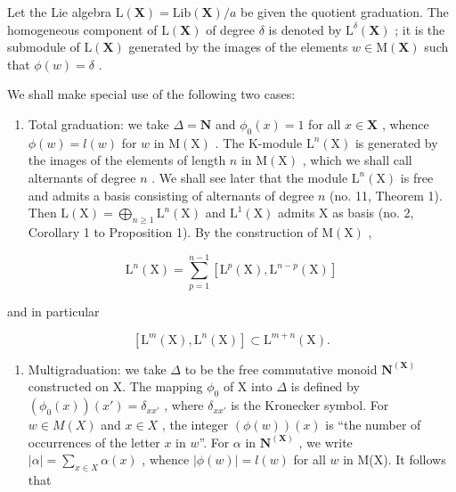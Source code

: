 Let the Lie algebra \(\mathrm{L}(\mathbf{X}) = \mathrm{Lib}(\mathbf{X}) / a\) be given the quotient graduation. The homogeneous component of \(\mathrm{L}(\mathbf{X})\) of degree \(\delta\) is denoted by \(\mathrm{L}^{\delta}(\mathbf{X})\) ; it is the submodule of \(\mathrm{L}(\mathbf{X})\) generated by the images of the elements \(w \in \mathrm{M}(\mathbf{X})\) such that \(\phi(w) = \delta\) .

We shall make special use of the following two cases:

\begin{enumerate}
\def\labelenumi{(\alph{enumi})}
\tightlist
\item
  Total graduation: we take \(\Delta = \mathbf{N}\) and \(\phi_0(x) = 1\) for all \(x\in \mathbf{X}\) , whence \(\phi (w) = l(w)\) for \(w\) in \(\mathrm{M}(\mathrm{X})\) . The K-module \(\mathrm{L}^n (\mathrm{X})\) is generated by the images of the elements of length \(n\) in \(\mathrm{M}(\mathrm{X})\) , which we shall call alternants of degree \(n\) . We shall see later that the module \(\mathrm{L}^n (\mathrm{X})\) is free and admits a basis consisting of alternants of degree \(n\) (no. 11, Theorem 1). Then \(\mathrm{L}(\mathrm{X}) = \bigoplus_{n\geq 1}\mathrm{L}^n (\mathrm{X})\) and \(\mathrm{L}^1 (\mathrm{X})\) admits X as basis (no. 2, Corollary 1 to Proposition 1). By the construction of \(\mathrm{M}(\mathrm{X})\) ,
\end{enumerate}

\[
\mathrm{L} ^ {n} (\mathrm{X}) = \sum_ {p = 1} ^ {n - 1} [ \mathrm{L} ^ {p} (\mathrm{X}), \mathrm{L} ^ {n - p} (\mathrm{X}) ]\tag{12}
\]

and in particular

\[
[ \mathrm{L} ^ {m} (\mathrm{X}), \mathrm{L} ^ {n} (\mathrm{X}) ] \subset \mathrm{L} ^ {m + n} (\mathrm{X}).\tag{13}
\]

\begin{enumerate}
\def\labelenumi{(\alph{enumi})}
\setcounter{enumi}{1}
\tightlist
\item
  Multigraduation: we take \(\Delta\) to be the free commutative monoid \(\mathbf{N}^{(\mathbf{X})}\) constructed on X. The mapping \(\phi_0\) of X into \(\Delta\) is defined by \((\phi_0(x))(x') = \delta_{xx'}\) , where \(\delta_{xx'}\) is the Kronecker symbol. For \(w \in M(X)\) and \(x \in X\) , the integer \((\phi(w))(x)\) is ``the number of occurrences of the letter \(x\) in \(w\)''. For \(\alpha\) in \(\mathbf{N}^{(\mathbf{X})}\) , we write \(|\alpha| = \sum_{x \in X} \alpha(x)\) , whence \(|\phi(w)| = l(w)\) for all \(w\) in M(X). It follows that
\end{enumerate}

